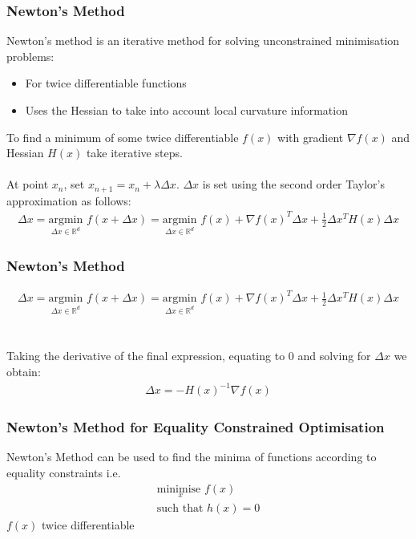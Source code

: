 \documentclass{beamer}
\def\rnum{\mathbb{R}}
\begin{document}
\begin{frame}
    \frametitle{Newton's Method}
    Newton's method is an iterative method for solving unconstrained minimisation problems:
    \begin{itemize}
        \item For twice differentiable functions
        \item Uses the Hessian to take into account local curvature information
    \end{itemize}
    To find a minimum of some twice differentiable $f(x)$ with gradient $\nabla
    f(x)$ and Hessian $H(x)$ take iterative
    steps.
    \\~\\
    At point $x_{n}$, set $x_{n+1} = x_{n} + \lambda \Delta x$. $\Delta x$ is set
    using the second order Taylor's approximation as follows:
    \begin{align*}
        \Delta x = \underset{\Delta x \in \rnum^{d}}{\text{argmin}}\, \,f(x + \Delta
        x) = \underset{\Delta x \in \rnum^{d}}{\text{argmin}} \, \, f(x) + \nabla f(x)^{T}
        \Delta x + \frac{1}{2}\Delta x^{T}H(x)\Delta x
    \end{align*}
\end{frame}

\begin{frame}
    \frametitle{Newton's Method}
    \begin{align*}
        \Delta x = \underset{\Delta x \in \rnum^{d}}{\text{argmin}}\, \,f(x + \Delta
        x) = \underset{\Delta x \in \rnum^{d}}{\text{argmin}} \, \, f(x) + \nabla f(x)^{T}
        \Delta x + \frac{1}{2}\Delta x^{T}H(x)\Delta x
    \end{align*}
    \\~\\
    Taking the derivative of the final expression, equating to 0 and solving for
    $\Delta x$ we obtain:
    \begin{align*}
        \Delta x = -H(x)^{-1}\nabla f(x)
    \end{align*}
\end{frame}


\begin{frame}
    \frametitle{Newton's Method for Equality Constrained Optimisation}
    Newton's Method can be used to find the minima of functions according to
    equality constraints i.e.
    \begin{align*}
        \underset{x}{\text{minimise }}  f(x) \\
        \text{such that } h(x) = 0
    \end{align*}
    $f(x)$ twice differentiable
\end{frame}
\end{document}
